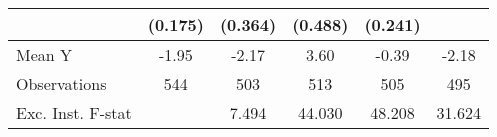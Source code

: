 {\begin{tabular}{l*{5}{c}}
            &     (0.175)         &     (0.364)         &     (0.488)         &     (0.241)         &                     \\
\midrule
Mean Y      &       -1.95         &       -2.17         &        3.60         &       -0.39         &       -2.18         \\
Observations&         544         &         503         &         513         &         505         &         495         \\
Exc. Inst. F-stat&                     &       7.494         &      44.030         &      48.208         &      31.624         \\
\bottomrule
\end{tabular}
}
